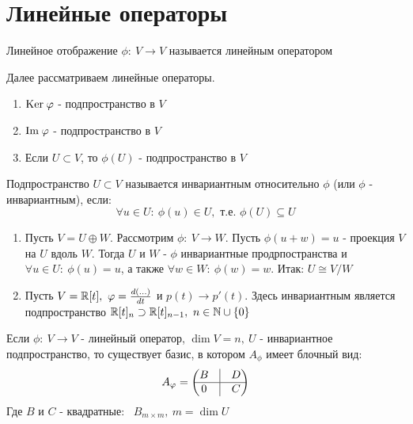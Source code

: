 \section{Линейные операторы}
    \begin{definition}
        Линейное отображение $\phi: \ V \to V$ называется линейным оператором 
    \end{definition}
    Далее рассматриваем линейные операторы.
    \begin{subtheorem} \tab
        \begin{enumerate}
            \item $\text{Ker} \hspace{0.09cm} \phi$ - подпространство в $V$
            \item $\text{Im} \hspace{0.09cm} \phi$ - подпространство в $V$
            \item Если $U \subset V$, то $\phi(U)$ - подпространство в $V$
        \end{enumerate} 
    \end{subtheorem}
    \begin{definition}
        Подпространство $U \subset V$ называется инвариантным относительно $\phi$ (или $\phi$ - инвариантным), если: 
        $$\forall u \in U: \ \phi(u) \in U, \text{ т.е. }\phi(U) \subseteq U$$   
    \end{definition} 
    \begin{example}\tab
        \begin{enumerate}
            \item Пусть $V = U \oplus W$. Рассмотрим $\phi: \ V \to W$. Пусть $\phi(u + w) = u$ - проекция $V$ на $U$ вдоль $W$. Тогда $U$ и $W$ - $\phi$ инвариантные продрпостранства и $\forall u \in U: \ \phi(u) = u$, а также $\forall w \in W: \ \phi(w) = w$. Итак: $U \cong V/W$
            \item Пусть $V = \R[t], \ \phi = \frac{d(...)}{dt}$ и $p(t) \to p'(t)$. Здесь инвариантным является подпространство $\R[t]_n \supset \R[t]_{n-1}, \ n \in \N \cup \{0\}$               
        \end{enumerate}
    \end{example}
    \begin{theorem}
        Если $\phi: \ V \to V$ - линейный оператор, $\dim V = n, \ U$ - инвариантное подпространство, то существует базис, в котором $A_\phi$ имеет блочный вид: 
        $$A_\phi = \begin{pmatrix}
            B & \vline & D \\ \hline 0 & \vline & C
        \end{pmatrix}$$
        Где $B$ и $C$ - квадратные: \ $B_{m \times m}, \ m = \dim U$   
    \end{theorem}
